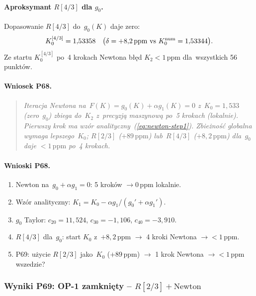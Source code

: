 \paragraph{Aproksymant $R[4/3]$ dla $g_0$.}
Dopasowanie $R[4/3]$ do~$g_0(K)$ daje zero:
\[
  K_0^{[4/3]} = 1{,}53358 \quad
  \bigl(\delta = +8{,}2\,\mathrm{ppm}\ \text{vs }K_0^{\rm num}=1{,}53344\bigr).
\]
Ze startu $K_0^{[4/3]}$ po~4 krokach Newtona b\l{\k{e}}d $K_2 < 1\,\mathrm{ppm}$
dla~wszystkich 56 punkt\'ow.

\paragraph{Wniosek P68.}
\begin{quote}
\emph{Iteracja Newtona na~$F(K)=g_0(K)+\alpha g_1(K)=0$ z~$K_0=1{,}533$
(zero~$g_0$) zbiega do~$K_2$ z~precyzj\k{a} maszynow\k{a} po~5 krokach (lokalnie).
Pierwszy krok ma wz\'or analityczny~(\ref{eq:newton-step1}).
Zbie\.zno\'s\'c globalna wymaga lepszego~$K_0$;
$R[2/3]$ ($+89\,\mathrm{ppm}$) lub~$R[4/3]$ ($+8{,}2\,\mathrm{ppm}$)
dla~$g_0$ daje $<1\,\mathrm{ppm}$ po~4 krokach.}
\end{quote}

\paragraph{Wnioski P68.}
\begin{enumerate}
  \item Newton na~$g_0+\alpha g_1=0$: 5 krok\'ow $\to 0\,\mathrm{ppm}$ lokalnie.
  \item Wz\'or analityczny: $K_1=K_0-\alpha g_1/(g_0'+\alpha g_1')$.
  \item $g_0$ Taylor: $c_{20}=11{,}524$, $c_{30}=-1{,}106$, $c_{40}=-3{,}910$.
  \item $R[4/3]$ dla~$g_0$: start $K_0$ z~$+8{,}2\,\mathrm{ppm}$ $\to$ 4 kroki Newtona $\to<1\,\mathrm{ppm}$.
  \item P69: u\.zycie $R[2/3]$ jako~$K_0$ ($+89\,\mathrm{ppm}$) $\to$ 1 krok Newtona $\to <1\,\mathrm{ppm}$ wszedzie?
\end{enumerate}

\subsubsection{Wyniki P69: OP-1 zamkni\k{e}ty -- $R[2/3]+\mathrm{Newton}$}
\label{app:F-P69}

